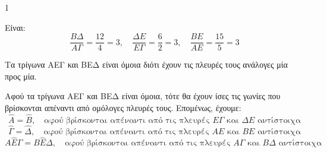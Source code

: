 \begin{ylh}{1}
    \item [Ύλη από εικόνα]
\end{ylh}
\begin{figure}
\end{figure}
\begin{alist}
    \item [α)] Είναι:
    \[
    \frac{B\Delta}{A\Gamma} = \frac{12}{4} = 3, \quad \frac{\Delta E}{E\Gamma} = \frac{6}{2} = 3, \quad \frac{BE}{AE} = \frac{15}{5} = 3
    \]
    \item [β)] Τα τρίγωνα ΑΕΓ και ΒΕΔ είναι όμοια διότι έχουν τις πλευρές τους ανάλογες μία προς μία.
    \item [γ)] Αφού τα τρίγωνα ΑΕΓ και ΒΕΔ είναι όμοια, τότε θα έχουν ίσες τις γωνίες που βρίσκονται απέναντι από ομόλογες πλευρές τους. Επομένως, έχουμε:
    \[
    \hat{A} = \hat{B}, \quad \text{αφού βρίσκονται απέναντι από τις πλευρές } E\Gamma \text{ και } \Delta E \text{ αντίστοιχα}
    \]
    \[
    \hat{\Gamma} = \hat{\Delta}, \quad \text{αφού βρίσκονται απέναντι από τις πλευρές } AE \text{ και } BE \text{ αντίστοιχα}
    \]
    \[
    A\hat{E}\Gamma = B\hat{E}\Delta, \quad \text{αφού βρίσκονται απέναντι από τις πλευρές } A\Gamma \text{ και } B\Delta \text{ αντίστοιχα}
    \]
\end{alist}
